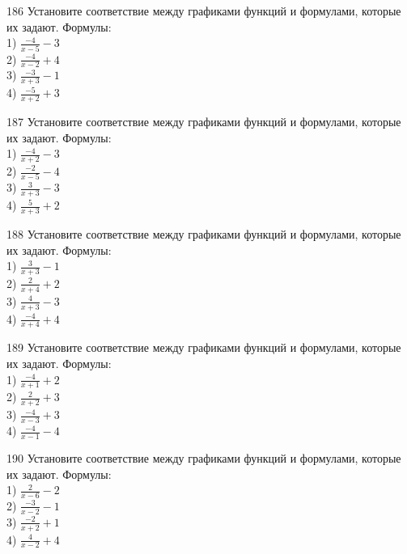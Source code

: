 \documentclass[4apaper]{article}
\begin{document}
\begin{taskBN}{186}
Установите соответствие между графиками функций и формулами, которые их задают. Формулы: \\1) $\frac{-4}{x-5}-3$\\2) $\frac{-4}{x-2}+4$\\3) $\frac{-3}{x+3}-1$\\4) $\frac{-5}{x+2}+3$
\end{taskBN}

\begin{taskBN}{187}
Установите соответствие между графиками функций и формулами, которые их задают. Формулы: \\1) $\frac{-4}{x+2}-3$\\2) $\frac{-2}{x-5}-4$\\3) $\frac{3}{x+3}-3$\\4) $\frac{5}{x+3}+2$
\end{taskBN}

\begin{taskBN}{188}
Установите соответствие между графиками функций и формулами, которые их задают. Формулы: \\1) $\frac{3}{x+3}-1$\\2) $\frac{2}{x+4}+2$\\3) $\frac{4}{x+3}-3$\\4) $\frac{-4}{x+4}+4$
\end{taskBN}

\begin{taskBN}{189}
Установите соответствие между графиками функций и формулами, которые их задают. Формулы: \\1) $\frac{-4}{x+1}+2$\\2) $\frac{2}{x+2}+3$\\3) $\frac{-4}{x-3}+3$\\4) $\frac{-4}{x-1}-4$
\end{taskBN}

\begin{taskBN}{190}
Установите соответствие между графиками функций и формулами, которые их задают. Формулы: \\1) $\frac{2}{x-6}-2$\\2) $\frac{-3}{x-2}-1$\\3) $\frac{-2}{x+2}+1$\\4) $\frac{4}{x-2}+4$
\end{taskBN}
\end{document}
